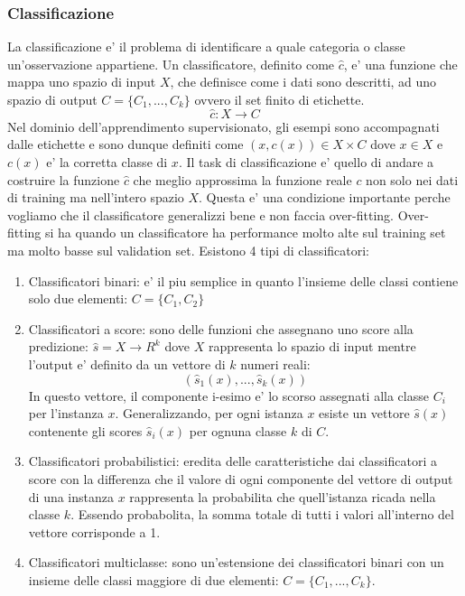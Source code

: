 \subsubsection{Classificazione}
La classificazione e' il problema di identificare a quale categoria o classe un'osservazione appartiene. Un classificatore, definito come \(\hat{c}\), e' una funzione che mappa uno spazio di input \(X\), che definisce come i dati sono descritti, ad uno spazio di output \(C=\{C_1,...,C_k\}\) ovvero il set finito di etichette.
\[\hat{c}: X \rightarrow C\]
Nel dominio dell'apprendimento supervisionato, gli esempi sono accompagnati dalle etichette e sono dunque definiti come \((x,c(x))\in X\times C\) dove \(x \in X\) e \(c(x)\) e' la corretta classe di \(x\). Il task di classificazione e' quello di andare a costruire la funzione \(\hat{c}\) che meglio approssima la funzione reale \(c\) non solo nei dati di training ma nell'intero spazio \(X\). Questa e' una condizione importante perche vogliamo che il classificatore generalizzi bene e non faccia over-fitting. Over-fitting si ha quando un classificatore ha performance molto alte sul training set ma molto basse sul validation set.
Esistono 4 tipi di classificatori:
\begin{enumerate}
\item Classificatori binari: e' il piu semplice in quanto l'insieme delle classi contiene solo due elementi: \(C=\{C_1,C_2\}\)
\item Classificatori a score: sono delle funzioni che assegnano uno score alla predizione: \(\hat{s} = X\rightarrow R^k\) dove \(X\) rappresenta lo spazio di input mentre l'output e' definito da un vettore di \(k\) numeri reali: \[(\hat{s}_1 (x),...,\hat{s}_k(x))\]In questo vettore, il componente i-esimo e' lo scorso assegnati alla classe \(C_i\) per l'instanza \(x\). Generalizzando, per ogni istanza \(x\) esiste un vettore \(\hat{s}(x)\) contenente gli scores \(\hat{s}_i(x)\) per ognuna classe \(k\) di \(C\).
\item Classificatori probabilistici: eredita delle caratteristiche dai classificatori a score con la differenza che il valore di ogni componente del vettore di output di una instanza \(x\) rappresenta la probabilita che quell'istanza ricada nella classe \(k\). Essendo probabolita, la somma totale di tutti i valori all'interno del vettore corrisponde a 1.
\item Classificatori multiclasse: sono un'estensione dei classificatori binari con un insieme delle classi maggiore di due elementi: \(C=\{C_1,...,C_k\}\). 
\end{enumerate}

